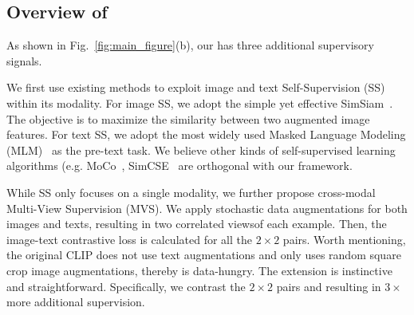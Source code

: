 \subsection{Overview of \workname}

As shown in Fig.~\ref{fig:main_figure}(b), our \workname has three additional supervisory signals. 

\protect{}  We first use existing methods to exploit image and text Self-Supervision (SS) within its modality. 
For image SS, we adopt the simple yet effective SimSiam~\citep{chen2021exploring}.
The objective is to maximize the similarity between two augmented image features.
For text SS, we adopt the most widely used Masked Language Modeling (MLM)~\citep{devlin2018bert} as the pre-text task. 
We believe other kinds of self-supervised learning algorithms (e.g. MoCo~\citep{he2020momentum}, SimCSE~\citep{gao2021simcse} are orthogonal with our framework.

\protect{} While SS only focuses on a single modality, we further propose cross-modal Multi-View Supervision (MVS).
We apply stochastic data augmentations for both images and texts, resulting in two correlated views\footnotemark[1] of each example.
Then, the image-text contrastive loss is calculated for all the $2\times2$ pairs.
Worth mentioning, the original CLIP does not use text augmentations and only uses random square crop image augmentations, thereby is data-hungry.
The extension is instinctive and straightforward. Specifically, we contrast the $2\times2$ pairs and resulting in $3\times$ more additional supervision.




